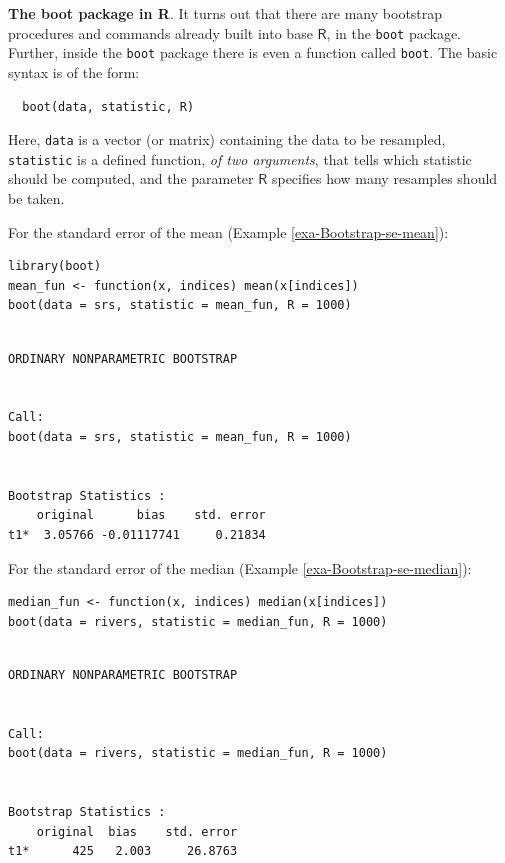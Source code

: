 \documentclass[captions=tableheading]{scrbook}
\begin{document}
\begin{example}
\textbf{The boot package in R}. It turns out that there are many bootstrap procedures and commands already built into base \(\mathsf{R}\), in the \texttt{boot} package. Further, inside the \texttt{boot} package there is even a function called \texttt{boot}. The basic syntax is of the form:

\begin{verbatim}
  boot(data, statistic, R)
\end{verbatim}

\end{example}
 Here, \texttt{data} is a vector (or matrix) containing the data to be resampled, \texttt{statistic} is a defined function, \emph{of two arguments}, that tells which statistic should be computed, and the parameter \(\mathsf{R}\) specifies how many resamples should be taken.

For the standard error of the mean (Example \ref{exa-Bootstrap-se-mean}):


\begin{verbatim}
library(boot)
mean_fun <- function(x, indices) mean(x[indices])
boot(data = srs, statistic = mean_fun, R = 1000)
\end{verbatim}


\begin{verbatim}
 
ORDINARY NONPARAMETRIC BOOTSTRAP


Call:
boot(data = srs, statistic = mean_fun, R = 1000)


Bootstrap Statistics :
    original      bias    std. error
t1*  3.05766 -0.01117741     0.21834
\end{verbatim}

For the standard error of the median (Example \ref{exa-Bootstrap-se-median}):


\begin{verbatim}
median_fun <- function(x, indices) median(x[indices])
boot(data = rivers, statistic = median_fun, R = 1000)
\end{verbatim}


\begin{verbatim}

ORDINARY NONPARAMETRIC BOOTSTRAP


Call:
boot(data = rivers, statistic = median_fun, R = 1000)


Bootstrap Statistics :
    original  bias    std. error
t1*      425   2.003     26.8763
\end{verbatim}
\end{document}
